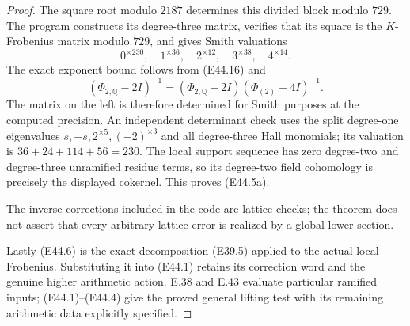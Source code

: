 \begin{proof}
The square root modulo $2187$
determines this divided block
modulo $729$. The program
constructs its degree-three
matrix, verifies that its square
is the $K$-Frobenius matrix
modulo $729$, and gives Smith
valuations
\[
 0^{\times230},\quad1^{\times36},\quad
 2^{\times12},\quad3^{\times38},\quad4^{\times14}.
 \tag{E44.19}
\]
The exact exponent bound follows
from (E44.16) and
\[
 (\Phi_{2,\mathbb Q}-2I)^{-1}
   =(\Phi_{2,\mathbb Q}+2I)
                     (\Phi_{(2)}-4I)^{-1}.
\]
The matrix on the left is
therefore determined for Smith
purposes at the computed
precision. An independent
determinant check uses the
split degree-one eigenvalues
$s,-s,2^{\times5},(-2)^{\times3}$
and all degree-three Hall
monomials; its valuation is
$36+24+114+56=230$.
The local support sequence has
zero degree-two and degree-three
unramified residue terms, so its
degree-two field cohomology is
precisely the displayed cokernel.
This proves (E44.5a).

The inverse corrections included
in the code are lattice checks;
the theorem does not assert that
every arbitrary lattice error is
realized by a global lower section.

Lastly (E44.6) is the exact
decomposition (E39.5) applied
to the actual local Frobenius.
Substituting it into (E44.1)
retains its correction word and
the genuine higher arithmetic
action. E.38 and E.43 evaluate
particular ramified inputs;
(E44.1)--(E44.4) give the proved
general lifting test with its
remaining arithmetic data
explicitly specified.
\end{proof}
